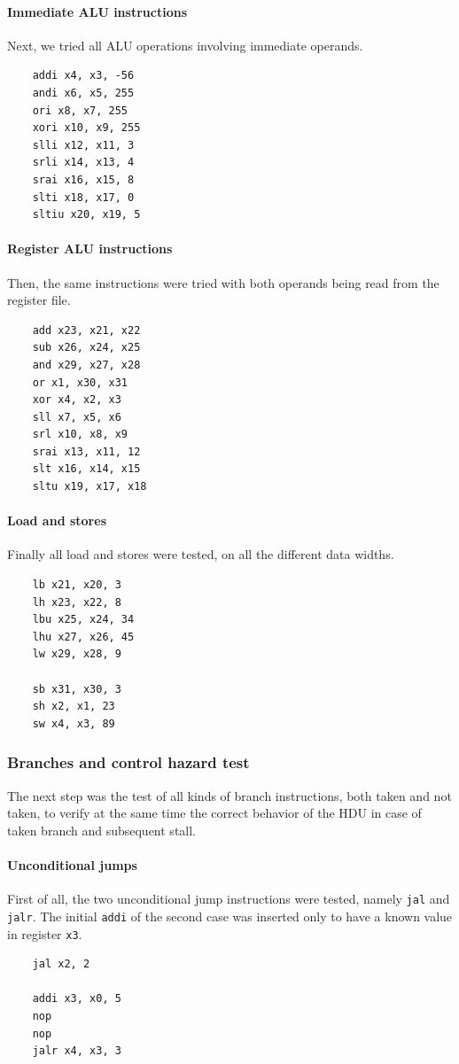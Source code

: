 \documentclass[a4paper]{article}
\begin{document}
\paragraph{Immediate ALU instructions}
Next, we tried all ALU operations involving immediate operands.

\begin{verbatim}
    addi x4, x3, -56
    andi x6, x5, 255
    ori x8, x7, 255
    xori x10, x9, 255
    slli x12, x11, 3 
    srli x14, x13, 4
    srai x16, x15, 8
    slti x18, x17, 0
    sltiu x20, x19, 5
\end{verbatim}

\paragraph{Register ALU instructions}
Then, the same instructions were tried with both operands being read from the register file.

\begin{verbatim}
    add x23, x21, x22
    sub x26, x24, x25
    and x29, x27, x28
    or x1, x30, x31
    xor x4, x2, x3
    sll x7, x5, x6
    srl x10, x8, x9
    srai x13, x11, 12
    slt x16, x14, x15
    sltu x19, x17, x18
\end{verbatim}

\paragraph{Load and stores}
Finally all load and stores were tested, on all the different data widths.

\begin{verbatim}
    lb x21, x20, 3
    lh x23, x22, 8
    lbu x25, x24, 34
    lhu x27, x26, 45
    lw x29, x28, 9

    sb x31, x30, 3
    sh x2, x1, 23
    sw x4, x3, 89
\end{verbatim}

\subsubsection{Branches and control hazard test}
The next step was the test of all kinds of branch instructions, both taken and not taken, to verify at the same time the correct behavior of the HDU in case of taken branch and subsequent stall.

\paragraph{Unconditional jumps}
First of all, the two unconditional jump instructions were tested, namely \texttt{jal} and \texttt{jalr}. The initial \texttt{addi} of the second case was inserted only to have a known value in register \texttt{x3}.
\begin{verbatim}
    jal x2, 2

    addi x3, x0, 5
    nop
    nop
    jalr x4, x3, 3
\end{verbatim}
\end{document}
